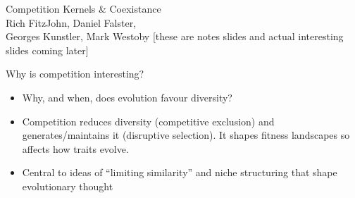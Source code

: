 \documentclass[12pt]{beamer}
\begin{document}
\begin{frame}
  \thispagestyle{empty}
  \begin{center}
    \sf
    {\Huge Competition Kernels \& Coexistance}\\[2ex]
    {\large Rich FitzJohn, Daniel Falster,\\[1ex]
    Georges Kunstler, Mark Westoby}
  \vfill
  [these are notes slides and actual interesting slides coming later]
  \end{center}
\end{frame}

\begin{frame}{Why is competition interesting?}

  \begin{itemize}
  \item Why, and when, does evolution favour diversity?
  \item Competition reduces diversity (competitive exclusion) and
    generates/maintains it (disruptive selection).  It shapes fitness
    landscapes so affects how traits evolve.
  \item Central to ideas of ``limiting similarity'' and niche
    structuring that shape evolutionary thought
  \end{itemize}
\end{frame}
\end{document}
